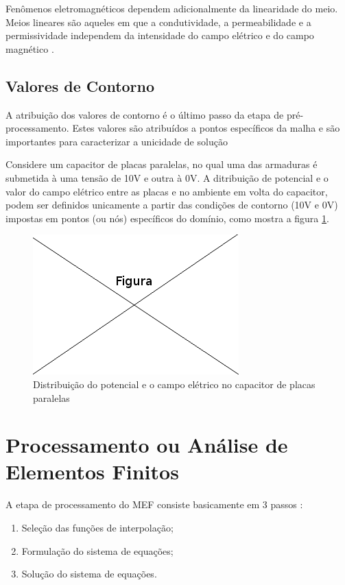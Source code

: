 \documentclass[
    12pt,               %
    openright,          %
    oneside,
    a4paper,            %
    english,            %
    french,             %
    spanish,            %
    brazil              %
    ]{abntex2}
\begin{document}
Fenômenos eletromagnéticos dependem adicionalmente da linearidade do meio. Meios lineares são aqueles em que a condutividade, a permeabilidade e a permissividade independem da intensidade do campo elétrico e do campo magnético \cite[p. 20]{sadiku} .


\subsection{Valores de Contorno}
A atribuição dos valores de contorno é o último passo da etapa de pré- processamento. Estes valores são atribuídos a pontos específicos da malha e são importantes para caracterizar a unicidade de solução \cite[p. 7]{zien}

Considere um capacitor de placas paralelas, no qual uma das armaduras é submetida à uma tensão de 10V e outra à 0V. A ditribuição de potencial e o valor do campo elétrico entre as placas e no ambiente em volta do capacitor, podem ser definidos unicamente a partir das condições de contorno (10V e 0V) impostas em pontos (ou nós) específicos do domínio, como mostra a figura \ref{fig:capacitor}.

\begin{figure}[!htb]
\centering
\includegraphics[scale=0.5]{figuras/temp.png}
\caption{Distribuição do potencial e o campo elétrico no capacitor de placas paralelas}
\label{fig:capacitor}
\end{figure}


\section{Processamento ou Análise de Elementos Finitos}
A etapa de processamento do MEF consiste basicamente em 3 passos \cite[p. 31]{jin}:

\begin{enumerate}  
\item Seleção das funções de interpolação;
\item Formulação do sistema de equações;
\item Solução do sistema de equações. 
\end{enumerate}
\end{document}
